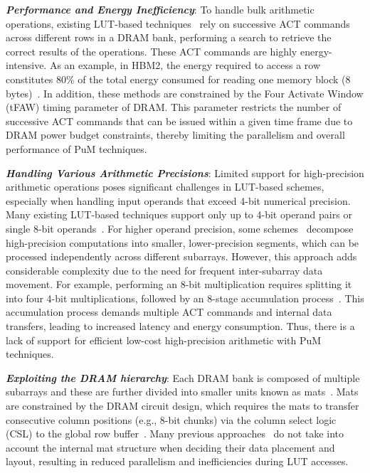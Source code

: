 \textbf{\textit{Performance and Energy Inefficiency}}: To handle bulk arithmetic operations, existing LUT-based techniques~\cite{pluto,red-LUT} rely on successive ACT commands across different rows in a DRAM bank, performing a search to retrieve the correct results of the operations. These ACT commands are highly energy-intensive. As an example, in HBM2, the energy required to access a row constitutes 80\% of the total energy consumed for reading one memory block (8 bytes)~\cite{fine-grained}. In addition, these methods are constrained by the Four Activate Window (tFAW) timing parameter of DRAM. This parameter restricts the number of successive ACT commands that can be issued within a given time frame due to DRAM power budget constraints, thereby limiting the parallelism and overall performance of PuM techniques.


\textbf{\textit{Handling Various Arithmetic Precisions}}: Limited support for high-precision arithmetic operations poses significant challenges in LUT-based schemes, especially when handling input operands that exceed 4-bit numerical precision. Many existing LUT-based techniques support only up to 4-bit operand pairs or single 8-bit operands~\cite{reconfigurable_pim}. For higher operand precision, some schemes~\cite{ppim, pluto, lacc} decompose high-precision computations into smaller, lower-precision segments, which can be processed independently across different subarrays. However, this approach adds considerable complexity due to the need for frequent inter-subarray data movement. For example, performing an 8-bit multiplication requires splitting it into four 4-bit multiplications, followed by an 8-stage accumulation process~\cite{ppim}. This accumulation process demands multiple ACT commands and internal data transfers, leading to increased latency and energy consumption. Thus, there is a lack of support for efficient low-cost high-precision arithmetic with PuM techniques.

\textbf{\textit{Exploiting the DRAM hierarchy}}: Each DRAM bank is composed of multiple subarrays and these are further divided into smaller units known as mats~\cite{processingDRAMparadigm}. Mats are constrained by the DRAM circuit design, which requires the mats to transfer consecutive column positions (e.g., 8-bit chunks) via the column select logic (CSL) to the global row buffer~\cite{fulcrum}. Many previous approaches~\cite{red-LUT,reconfigurable_pim, pluto} do not take into account the internal mat structure when deciding their data placement and layout, resulting in reduced parallelism and inefficiencies during LUT accesses.

